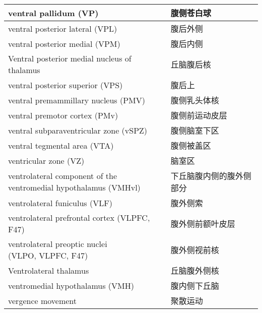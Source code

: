 \begin{longtable}{lll}
	\midrule
	ventral pallidum (VP)  && 腹侧苍白球  \\
	
	\midrule
	ventral posterior lateral (VPL)   && 腹后外侧  \\
	
	\midrule
	ventral posterior medial (VPM)   && 腹后内侧  \\
	
	\midrule
	Ventral posterior medial nucleus of thalamus   && 丘脑腹后核  \\
	
	\midrule
	ventral posterior superior (VPS)   && 腹后上  \\
	
	\midrule
	ventral premammillary nucleus (PMV)  && 腹侧乳头体核  \\
	
	\midrule
	ventral premotor cortex (PMv)   && 腹侧前运动皮层  \\
	
	\midrule
	ventral subparaventricular zone (vSPZ)  && 腹侧脑室下区  \\
	
	\midrule
	ventral tegmental area (VTA)   && 腹侧被盖区  \\
	
	\midrule
	ventricular zone (VZ)   && 脑室区  \\
	
	\midrule
	\makecell[l]{ventrolateral component of the \\ventromedial hypothalamus (VMHvl)}  && 下丘脑腹内侧的腹外侧部分  \\
	
	\midrule
	ventrolateral funiculus (VLF)   && 腹外侧索  \\
	
	\midrule
	ventrolateral prefrontal cortex (VLPFC, F47)   && 腹外侧前额叶皮层  \\
	
	\midrule
	\makecell[l]{ventrolateral preoptic nuclei\\ (VLPO, VLPFC, F47)}  && 腹外侧视前核  \\
	
	\midrule
	Ventrolateral thalamus   && 丘脑腹外侧核  \\
	
	\midrule
	ventromedial hypothalamus (VMH)  && 腹内侧下丘脑  \\
	
	\midrule
	vergence movement   && 聚散运动  \\
	

\end{longtable}

